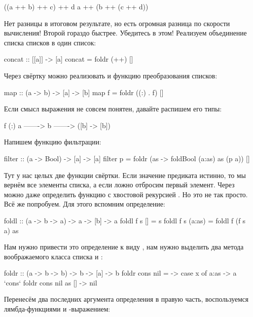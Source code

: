 \begin{code}
((a ++ b) ++ c) ++ d
a ++ (b ++ (c ++ d))
\end{code}

Нет разницы в итоговом результате, но есть огромная разница
по скорости вычисления! Второй гораздо быстрее. Убедитесь
в этом! Реализуем объединение списка списков
в один список:

\begin{code}
concat :: [[a]] -> [a]
concat = foldr (++) []
\end{code}

Через свёртку можно реализовать и функцию преобразования списков:

\begin{code}
map :: (a -> b) -> [a] -> [b]
map f = foldr ((:) . f) []
\end{code}

Если смысл выражения  не совсем понятен, давайте
распишем его типы:

\begin{code}
      f           (:)
a  ------->  b  ------->  ([b] -> [b])
\end{code}

Напишем функцию фильтрации:

\begin{code}
filter :: (a -> Bool) -> [a] -> [a]
filter p = foldr (\a as -> foldBool (a:as) as (p a)) []
\end{code}

Тут у нас целых две функции свёртки. Если значение
предиката  истинно, то мы вернём все элементы списка,
а если ложно отбросим первый элемент.
Через  можно даже определить функцию с хвостовой
рекурсией . Но это не так просто. Всё же попробуем.
Для этого вспомним определение:

\begin{code}
foldl :: (a -> b -> a) -> a -> [b] -> a
foldl f s []        = s
foldl f s (a:as)    = foldl f (f s a) as
\end{code}

Нам нужно привести это определение к виду , 
нам нужно выделить два метода воображаемого класса списка
 и :

\begin{code}
foldr :: (a -> b -> b) -> b -> [a] -> b
foldr cons nil = \x -> case x of
    a:as    -> a `cons` foldr cons nil as
    []      -> nil    
\end{code}

Перенесём два последних аргумента определения
 в правую часть, воспользуемся
лямбда-функциями и -выражением:

